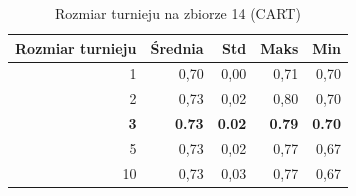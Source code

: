 \begin{table}[htbp]
\centering
\small
\setlength{\tabcolsep}{6pt}
\renewcommand{\arraystretch}{1.2}
\caption{Rozmiar turnieju na zbiorze 14 (CART)}
\label{tab:CART_tournament_size_14}
\begin{tabular}{r|r|r|r|r}
\toprule
Rozmiar turnieju & Średnia & Std & Maks & Min \\
\hline
1 & 0,70 & 0,00 & 0,71 & 0,70 \\
2 & 0,73 & 0,02 & 0,80 & 0,70 \\
\textbf{3} & \textbf{0.73} & \textbf{0.02} & \textbf{0.79} & \textbf{0.70} \\
5 & 0,73 & 0,02 & 0,77 & 0,67 \\
10 & 0,73 & 0,03 & 0,77 & 0,67 \\
\bottomrule
\end{tabular}
\end{table}